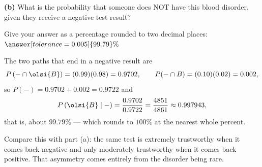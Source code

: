 \documentclass[12pt]{ximera}
\begin{document}
\begin{problem}
\begin{prompt}
\textbf{(b)} What is the probability that someone does NOT have this blood disorder,
given they receive a negative test result?

Give your answer as a percentage rounded to two decimal places:
$\answer[tolerance=0.005]{99.79}\%$

\begin{feedback}
The two paths that end in a negative result are
\[
P\left(-\cap\olsi{B}\right)=(0.99)(0.98)=0.9702, \qquad
P(-\cap B)=(0.10)(0.02)=0.002,
\]
so $P(-)=0.9702+0.002=0.9722$ and
\[
P\left(\olsi{B}\mid -\right)=\frac{0.9702}{0.9722}=\frac{4851}{4861}\approx 0.997943,
\]
that is, about $99.79\%$ --- which rounds to $100\%$ at the nearest whole percent.

Compare this with part (a): the same test is extremely trustworthy when it comes
back negative and only moderately trustworthy when it comes back positive. That
asymmetry comes entirely from the disorder being rare.
\end{feedback}
\end{prompt}
\end{problem}
\end{document}
